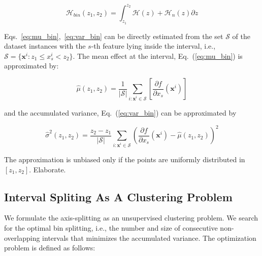 \documentclass[twoside]{article}
\newcommand{\dfdx}{\frac{\partial f}{\partial x_s}}
\begin{document}
\begin{equation}
  \label{eq:uncertainty_bin}
  \mathcal{H}_{bin}(z_1, z_2) = \int_{z_1}^{z_2} \mathcal{H}(z) + \mathcal{H}_n(z) \partial z
\end{equation}


Eqs.~\eqref{eq:mu_bin},~\eqref{eq:var_bin} can be directly estimated
from the set \(\mathcal{S}\) of the dataset instances with the
\(s\)-th feature lying inside the interval, i.e.,
\( \mathcal{S}= \{ \mathbf{x}^i : z_1 \leq x^i_s < z_2 \} \). The mean
effect at the interval, Eq.~(\ref{eq:mu_bin}) is approximated by:

\begin{equation}
  \label{eq:mean_estimation}
  \hat{\mu}(z_1, z_2) = \frac{1}{|\mathcal{S}|} \sum_{i:\mathbf{x}^i \in
    \mathcal{S}} \left [ \dfdx(\mathbf{x}^i) \right ]
\end{equation}

and the accumulated variance, Eq.~(\ref{eq:var_bin}) can be
approximated by

\begin{equation}
  \label{eq:variance_estimation}
  \hat{\sigma}^2(z_1, z_2) = \frac{z_2 - z_1}{|\mathcal{S}|} \sum_{i:\mathbf{x}^i \in
    \mathcal{S}} \left ( \dfdx(\mathbf{x}^i) - \hat{\mu}(z_1, z_2) \right )^2
\end{equation}


The approximation is unbiased only if the points are uniformly
distributed in \([z_1, z_2]\). Elaborate.

\subsection{Interval Spliting As A Clustering Problem}
\label{sec:interval-spliting}




We formulate the axis-splitting as an unsupervised clustering
problem. We search for the optimal bin splitting, i.e., the number and
size of consecutive non-overlapping intervals that minimizes the
accumulated variance. The optimization problem is defined as follows:
\end{document}
